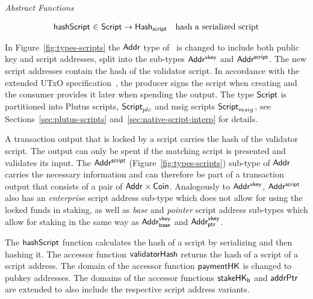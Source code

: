 \documentclass[11pt,a4paper,dvipsnames]{article}
\newcommand{\Addr}{\type{Addr}}
\newcommand{\AddrVKey}{\type{Addr^{vkey}}}
\newcommand{\Coin}{\type{Coin}}
\newcommand{\AddrVKeyB}{\type{Addr^{vkey}_{base}}}
\newcommand{\AddrVKeyP}{\type{Addr^{vkey}_{ptr}}}
\newcommand{\AddrScr}{\type{Addr^{script}}}
\newcommand{\HashScr}{\type{Hash_{script}}}
\newcommand{\Script}{\type{Script}}
\newcommand{\ScriptPlutus}{\Script_{plc}}
\newcommand{\ScriptMSig}{\Script_{msig}}
\theoremstyle{definition}
\begin{document}
\begin{figure*}[hbt]
  \emph{Abstract Functions}

  \begin{equation*}
    \begin{array}{r@{~\in~}lr}
      \fun{hashScript} & \Script \to \HashScr & \text{hash a serialized script}
    \end{array}
  \end{equation*}

  \caption{Types for Scripts and Script Addresses}
  \label{fig:types-scripts}
\end{figure*}

In Figure~\ref{fig:types-scripts} the $\Addr$ type of~\cite{shelley_formal_spec}
is changed to include both public key and script addresses, split into the
sub-types $\AddrVKey$ and $\AddrScr$. The new script addresses contain the hash
of the validator script. In accordance with the extended UTxO
specification~\cite{plutus_eutxo}, the producer signs the script when creating
and the consumer provides it later when spending the output. The type $\Script$
is partitioned into Plutus scripts, $\ScriptPlutus$ and msig scripts
$\ScriptMSig$, see Sections~\ref{sec:plutus-scripts}
and~\ref{sec:native-script-interp} for details.

A transaction output that is locked by a script carries the hash of the
validator script. The output can only be spent if the matching script is
presented and validates its input. The $\AddrScr$
(Figure~\ref{fig:types-scripts}) sub-type of $\Addr$ carries the necessary
information and can therefore be part of a transaction output that consists of a
pair of $\Addr\times\Coin$. Analogously to $\AddrVKey$, $\AddrScr$ also has an
\emph{enterprise} script address sub-type which does not allow for using the
locked funds in staking, as well as \emph{base} and \emph{pointer} script
address sub-types which allow for staking in the same way as $\AddrVKeyB$ and
$\AddrVKeyP$.

The $\mathsf{hashScript}$ function calculates the hash of a script by serializing
and then hashing it. The accessor function $\mathsf{validatorHash}$ returns the
hash of a script of a script address. The domain of the accessor function
$\mathsf{paymentHK}$ is changed to pubkey addresses. The domains of the accessor
functions $\mathsf{stakeHK_b}$ and $\mathsf{addrPtr}$ are extended to also include the
respective script address variants.
\end{document}
